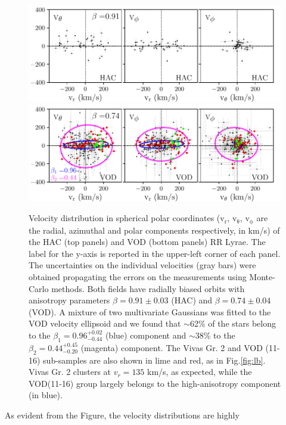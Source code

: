\documentclass[fleqn,usenatbib]{mnras}
\begin{document}
\begin{figure}
	\includegraphics[scale=0.55]{HAC_allv.pdf}
  \includegraphics[scale=0.55]{VOD_allv.pdf}
   \vspace{-0.45cm}
    \caption{Velocity distribution in spherical polar coordinates
      ($\mathrm{v_{r}}$, $\mathrm{v_{\theta}}$, $\mathrm{v_{\phi}}$ are the radial, azimuthal and
      polar components respectively, in km/s) of the HAC (top panels) and VOD (bottom panels) RR Lyrae.  The label for the y-axis is reported in the upper-left corner of each panel. The uncertainties on the individual velocities (gray bars) were obtained propagating the errors on the measurements using Monte-Carlo methods. Both fields have radially biased orbits with anisotropy parameters $\beta= 0.91 \pm 0.03$ (HAC) and $\beta= 0.74 \pm 0.04$ (VOD). A mixture of two multivariate Gaussians was fitted to the VOD velocity ellipsoid and we found that $\sim$62\% of the stars belong to the $\beta_{1}= 0.96^{+0.02}_{-0.44}$ (blue) component  and $\sim$38\%  to the $\beta_{2}=0.44^{+0.45}_{-0.20}$ (magenta) component. The Vivas Gr. 2 and VOD (11-16) sub-samples are also shown in lime and red, as in Fig.\ref{fig:lb}. Vivas Gr. 2 clusters at $v_{r} = 135$ km/s, as expected, while the VOD(11-16) group largely belongs to the high-anisotropy component (in blue).}
    \label{fig:vel}
\end{figure}
%
As evident from the Figure, the velocity distributions are highly
\end{document}

